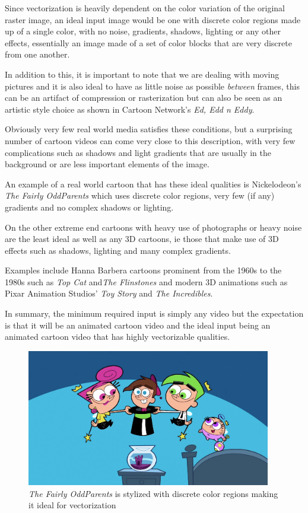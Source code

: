 \documentclass[12pt]{article}
\newcommand{\sentence}{} %
\newcommand{\italic}[1]{\textit{#1}}
\begin{document}
    \bigskip
    Since vectorization is heavily dependent on the color variation of the original raster image, an ideal input
    image would be one with discrete color regions made up of a single color, with no noise, gradients, shadows,
    lighting or any other effects, essentially an image made of a set of color blocks that are very discrete from one
    another.
    \sentence
    In addition to this, it is important to note that we are dealing with moving pictures and it is also ideal to
    have as little noise as possible \italic{between} frames, this can be an artifact of compression or
    rasterization but can also be seen as an artistic style choice as shown in Cartoon Network's
    \italic{Ed, Edd n Eddy}.
    \sentence
    Obviously very few real world media satisfies these conditions, but a surprising number of cartoon videos can come
    very close to this description, with very few complications such as shadows and light gradients that are usually
    in the background or are less important elements of the image.
    \sentence
    An example of a real world cartoon that has these ideal qualities is Nickelodeon's \italic{The Fairly OddParents}
    which uses discrete color regions, very few (if any) gradients and no complex shadows or lighting.
    \sentence
    On the other extreme end cartoons with heavy use of photographs or heavy noise are the least ideal as well as
    any 3D cartoons, ie those that make use of 3D effects such as shadows, lighting and many complex gradients.
    \sentence
    Examples include Hanna Barbera cartoons prominent from the 1960s to the 1980s such as \italic{Top Cat}
    and\italic{The Flinstones} and modern 3D animations such as Pixar Animation Studios'
    \italic{Toy Story} and \italic{The Incredibles}.
    \sentence
    In summary, the minimum required input is simply any video but the expectation is that it will be an
    animated cartoon video and the ideal input being an animated cartoon video that has highly vectorizable qualities.

    \bigskip
    \begin{figure}[h]
        \centering
        \includegraphics[width=0.95\textwidth]{FairlyOddParents.jpg}
        \caption[Fairly Odd Parents]{\italic{The Fairly OddParents} is stylized with discrete color regions making it
        ideal for vectorization}
        \label{fig:fairlyoddparents}
    \end{figure}
    \bigskip
\end{document}
